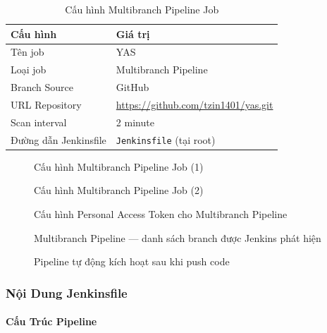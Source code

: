 \begin{table}[H]
\centering
\caption{Cấu hình Multibranch Pipeline Job}
\begin{tabular}{|l|l|}
\hline
\textbf{Cấu hình} & \textbf{Giá trị} \\
\hline
Tên job & YAS \\
\hline
Loại job & Multibranch Pipeline \\
\hline
Branch Source & GitHub \\
\hline
URL Repository & \url{https://github.com/tzin1401/yas.git} \\
\hline
Scan interval & 2 minute \\
\hline
Đường dẫn Jenkinsfile & \texttt{Jenkinsfile} (tại root) \\
\hline
\end{tabular}
\end{table}

\begin{figure}[H]
\centering
{}
\caption{Cấu hình Multibranch Pipeline Job (1)}
\end{figure}

\begin{figure}[H]
\centering
{}
\caption{Cấu hình Multibranch Pipeline Job (2)}
\end{figure}

\begin{figure}[H]
\centering
{}
\caption{Cấu hình Personal Access Token cho Multibranch Pipeline}
\end{figure}

\begin{figure}[H]
\centering
{}
\caption{Multibranch Pipeline — danh sách branch được Jenkins phát hiện}
\end{figure}

\begin{figure}[H]
\centering
{}
\caption{Pipeline tự động kích hoạt sau khi push code}
\end{figure}

\subsubsection{Nội Dung Jenkinsfile}

\paragraph{Cấu Trúc Pipeline}

